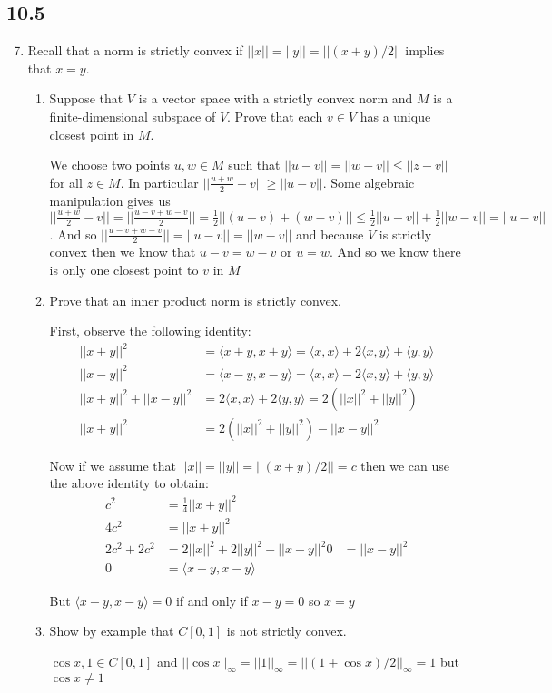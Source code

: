 \documentclass[letterpaper]{article}
\begin{document}
\renewcommand{\labelenumi}{\Alph{enumi}.}
\renewcommand{\labelenumii}{(\alph{enumii})}
\subsection*{10.5}
\begin{enumerate}
\setcounter{enumi}{6}
\item
Recall that a norm is strictly convex if $||x||=||y||=||(x+y)/2||$ implies that $x=y$.
  \begin{enumerate}
  \item
  Suppose that $V$ is a vector space with a strictly convex norm and $M$ is a finite-dimensional subspace of $V$. Prove that each $v\in V$ has a unique closest point in $M$.

  We choose two points $u,w\in M$ such that $||u-v||=||w-v||\le||z-v||$ for all $z\in M$. In particular $||\frac{u+w}{2}-v||\ge ||u-v||$. Some algebraic manipulation gives us $||\frac{u+w}{2}-v||=||\frac{u-v+w-v}{2}||=\frac{1}{2}||(u-v)+(w-v)||\le \frac{1}{2}||u-v||+\frac{1}{2}||w-v||=||u-v||$. And so $||\frac{u-v+w-v}{2}||=||u-v||=||w-v||$ and because $V$ is strictly convex then we know that $u-v=w-v$ or $u=w$. And so we know there is only one closest point to $v$ in $M$ 
  \item
  Prove that an inner product norm is strictly convex.

  First, observe the following identity:
  \begin{align*}
    ||x+y||^2&=\langle x+y,x+y\rangle=\langle x,x\rangle+2\langle x,y\rangle+\langle y,y\rangle\\
    ||x-y||^2&=\langle x-y,x-y\rangle=\langle x,x\rangle-2\langle x,y\rangle+\langle y,y\rangle\\
    ||x+y||^2+||x-y||^2&=2\langle x,x\rangle+2\langle y,y\rangle=2(||x||^2+||y||^2)\\
    ||x+y||^2&=2(||x||^2+||y||^2)-||x-y||^2
  \end{align*}

  Now if we assume that $||x||=||y||=||(x+y)/2||=c$ then we can use the above identity to obtain:
  \begin{align*}
    c^2&=\frac{1}{4}||x+y||^2\\
    4c^2&=||x+y||^2\\
    2c^2+2c^2&=2||x||^2+2||y||^2-||x-y||^2
    0&=||x-y||^2\\
    0&=\langle x-y,x-y\rangle
  \end{align*}

  But $\langle x-y,x-y\rangle=0$ if and only if $x-y=0$ so $x=y$
  \item
  Show by example that $C[0,1]$ is not strictly convex.

  $\cos x,1\in C[0,1]$ and $||\cos x||_\infty=||1||_\infty=||(1+\cos x)/2||_\infty=1$ but $\cos x\ne 1$
  \end{enumerate}

\end{enumerate}
\end{document}
